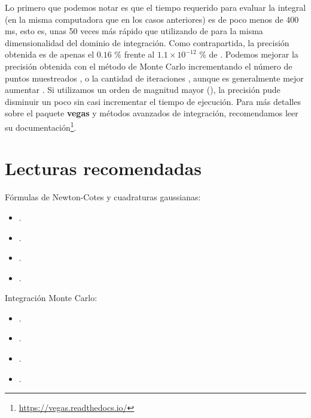 
Lo primero que podemos notar es que el tiempo requerido para evaluar la integral (en la misma computadora que en los casos anteriores) es de poco menos de 400 ms, esto es, unas 50 veces más rápido que utilizando  de  para la misma dimensionalidad del dominio de integración. Como contrapartida, la precisión obtenida es de apenas el $0.16$ \% frente al $1.1 \times 10^{-12}$ \% de . Podemos mejorar la precisión obtenida con el método de Monte Carlo incrementando el número de puntos muestreados , o la cantidad de iteraciones , aunque es generalmente mejor aumentar . Si utilizamos un orden de magnitud mayor (), la precisión pude disminuir un poco sin casi incrementar el tiempo de ejecución. Para más detalles sobre el paquete \textbf{vegas} y métodos avanzados de integración, recomendamos leer su documentación\footnote{\href{https://vegas.readthedocs.io/}{https://vegas.readthedocs.io/}}.


\section{Lecturas recomendadas}
Fórmulas de Newton-Cotes y cuadraturas gaussianas:
\begin{itemize}
 \item {}.
 \item {}.
 \item {}.
 \item {}.
\end{itemize}

Integración Monte Carlo:
\begin{itemize}
 \item {}. 
 \item {}.
 \item {}.
 \item {}.
\end{itemize}

